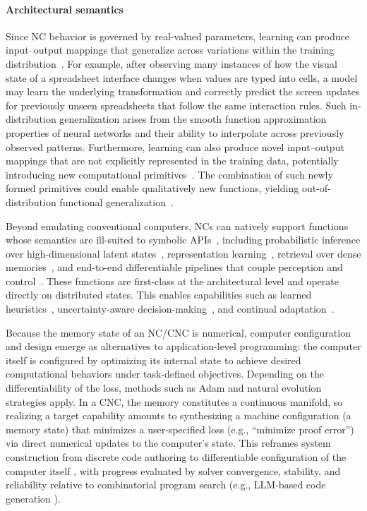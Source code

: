 \paragraph{Architectural semantics}
Since NC behavior is governed by real-valued parameters, learning can produce input–output mappings that generalize across variations within the training distribution~\citep{poggio2019theoretical}. For example, after observing many instances of how the visual state of a spreadsheet interface changes when values are typed into cells, a model may learn the underlying transformation and correctly predict the screen updates for previously unseen spreadsheets that follow the same interaction rules. Such in-distribution generalization arises from the smooth function approximation properties of neural networks and their ability to interpolate across previously observed patterns. 
Furthermore, learning can also produce novel input–output mappings that are not explicitly represented in the training data, potentially introducing new computational primitives~\citep{ha2016hypernetworks}. The combination of such newly formed primitives could enable qualitatively new functions, yielding out-of-distribution functional generalization~\citep{lake2018generalization}.

Beyond emulating conventional computers, NCs can natively support functions whose semantics are ill-suited to symbolic APIs~\citep{marcus2018deep}, including probabilistic inference over high-dimensional latent states~\citep{kingma2013auto}, representation learning~\citep{bengio2013representation}, retrieval over dense memories~\citep{graves2016hybrid}, and end-to-end differentiable pipelines that couple perception and control~\citep{silver2017mastering}. These functions are first-class at the architectural level and operate directly on distributed states. This enables capabilities such as learned heuristics~\citep{silver2017mastering}, uncertainty-aware decision-making~\citep{clements2019estimating}, and continual adaptation~\citep{parisi2019continual}.

Because the memory state of an NC/CNC is numerical, computer configuration and design emerge as alternatives to application-level programming: the computer itself is configured by optimizing its internal state to achieve desired computational behaviors under task-defined objectives. 
Depending on the differentiability of the loss, methods such as Adam \citep{adam2014method} and natural evolution strategies\citep{wierstra2014natural} apply. In a CNC, the memory constitutes a continuous manifold, so realizing a target capability amounts to synthesizing a machine configuration (a memory state) that minimizes a user-specified loss (e.g., “minimize proof error”) via direct numerical updates to the computer’s state. This reframes system construction from discrete code authoring to differentiable configuration of the computer itself \citep{innes2019differentiable}, with progress evaluated by solver convergence, stability, and reliability relative to combinatorial program search (e.g., LLM-based code generation \citep{hong2023metagpt}).

